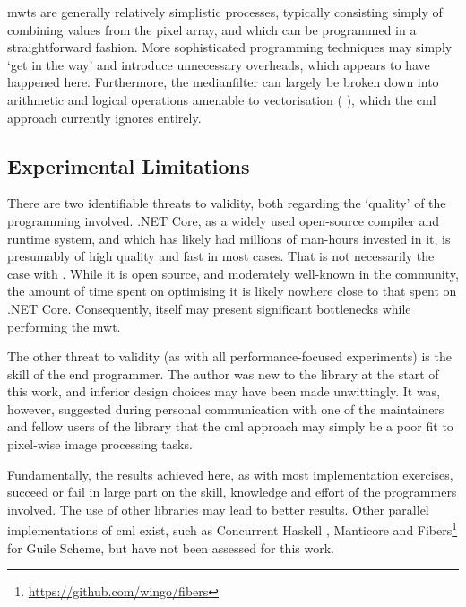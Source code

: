 \Glspl{mwt} are generally relatively simplistic processes, typically consisting simply of combining values from the pixel array, and which can be programmed in a straightforward fashion.  More sophisticated programming techniques may simply `get in the way' and introduce unnecessary overheads, which appears to have happened here.  Furthermore, the \gls{medianfilter} can largely be broken down into arithmetic and logical operations amenable to vectorisation (\eg{} \cite{Sanchez2012,Perreault2007}), which the \gls{cml} approach currently ignores entirely.

\subsection{Experimental Limitations}
There are two identifiable threats to validity, both regarding the `quality' of the programming involved.  .NET Core, as a widely used open-source compiler and runtime system, and which has likely had millions of man-hours invested in it, is presumably of high quality and fast in most cases.  That is not necessarily the case with \hopac{}.  While it is open source, and moderately well-known in the \fsharp{} community, the amount of time spent on optimising it is likely nowhere close to that spent on .NET Core.  Consequently, \hopac{} itself may present significant bottlenecks while performing the \gls{mwt}.

The other threat to validity (as with all performance-focused experiments) is the skill of the end programmer.  The author was new to the \hopac{} library at the start of this work, and inferior design choices may have been made unwittingly.  It was, however, suggested during personal communication with one of the maintainers and fellow users of the \hopac{} library that the \gls{cml} approach may simply be a poor fit to pixel-wise image processing tasks.

Fundamentally, the results achieved here, as with most implementation exercises, succeed or fail in large part on the skill, knowledge and effort of the programmers involved.  The use of other libraries may lead to better results.  Other parallel implementations of \gls{cml} exist, such as Concurrent Haskell \cite{Chaudhuri2009}, Manticore \cite{Reppy2009a} and Fibers\footnote{\url{https://github.com/wingo/fibers}} for Guile Scheme, but have not been assessed for this work.